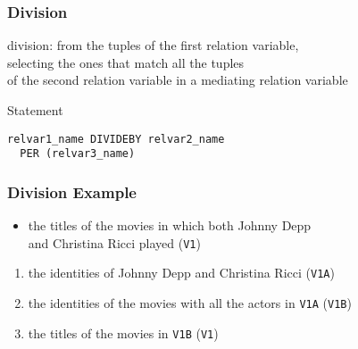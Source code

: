 \documentclass[dvipsnames]{beamer}
\theoremstyle{plain}
\begin{document}
\begin{frame}[fragile]
  \frametitle{Division}

  \begin{definition}
    \alert{division}: from the tuples of the first relation variable,\\
      selecting the ones that match all the tuples\\
      of the second relation variable in a mediating relation variable
  \end{definition}

  \pause
  \begin{block}{Statement}
    \begin{lstlisting}
relvar1_name DIVIDEBY relvar2_name
  PER (relvar3_name)
    \end{lstlisting}
  \end{block}
\end{frame}

\begin{frame}
  \frametitle{Division Example}

  \begin{example}
    \begin{itemize}
      \item the titles of the movies in which both Johnny Depp\\
        and Christina Ricci played (\texttt{V1})
    \end{itemize}

    \pause
    \begin{enumerate}
      \item the identities of Johnny Depp and Christina Ricci (\texttt{V1A})

      \pause
      \item the identities of the movies with all the actors in \texttt{V1A}
        (\texttt{V1B})

      \pause
      \item the titles of the movies in \texttt{V1B} (\texttt{V1})
    \end{enumerate}
  \end{example}
\end{frame}
\end{document}
